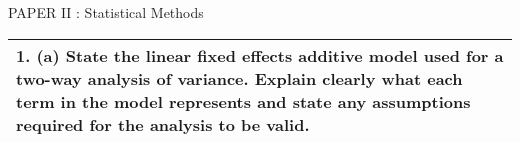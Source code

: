 \documentclass[a4paper,12pt]{article}
\begin{document}
PAPER II : Statistical Methods
\begin{table}[ht!]
 
\centering
 
\begin{tabular}{|p{15cm}|}
 
\hline  
\large
1. (a) State the linear fixed effects additive model used for a two-way analysis of variance.  Explain clearly what each term in the model represents and state any assumptions required for the analysis to be valid.

\\ \hline
  
\end{tabular}

\end{table}
\end{document}
